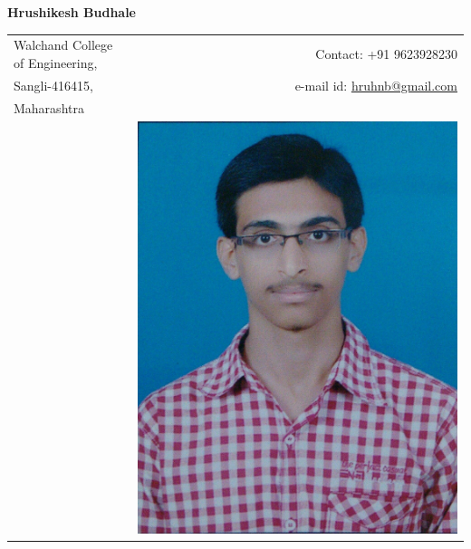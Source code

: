 \documentclass[a4paper,11pt,oneside]{article}
\begin{document}
\noindent\LARGE{\textbf{ Hrushikesh Budhale}}  \\
\vspace{0ex}
\noindent\hrulefill
\normalsize


\begin{center}
\vspace{-3ex}
\begin{tabular}{l r}
Walchand College of Engineering,    & \hspace{2.5in} Contact: +91 9623928230\\
Sangli-416415,                      & \hspace{2.5in} e-mail id: \href{mailto:hruhnb@gmail.com}{hruhnb@gmail.com} \\
Maharashtra                         & \\
                                 & \hspace{2.5in} \includegraphics[scale=0.04]{id.jpg} \\
\end{tabular}
\end{center}
\end{document}
